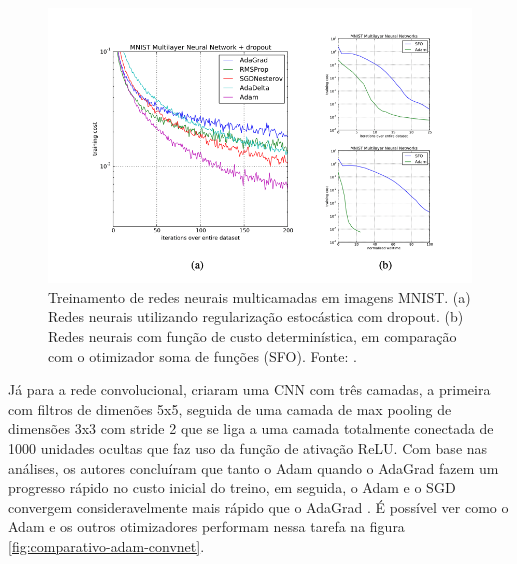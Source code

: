 \begin{figure}[h]
    \centering
    \includegraphics[width=0.85\linewidth]{../imagens/retropropagacao-gradiente/comparativo-adam-multilayer.png}
    
    \caption[Treinamento de redes neurais multicamadas no MNIST]{%
        Treinamento de redes neurais multicamadas em imagens MNIST. (a) Redes neurais utilizando regularização estocástica com dropout. (b) Redes neurais com função de custo determinística, em comparação com o otimizador soma de funções (SFO).
        \newline
        \small Fonte: \parencite{AdamMethod}.
    }
    \label{fig:comparativo-adam-multilayer}
\end{figure}

Já para a rede convolucional, \textcite{AdamMethod} criaram uma CNN com três camadas, a primeira com filtros de dimenões 5x5, seguida de uma camada de max pooling de dimensões 3x3 com stride 2 que se liga a uma camada totalmente conectada de 1000 unidades ocultas que faz uso da função de ativação ReLU. Com base nas análises, os autores concluíram que tanto o Adam quando o AdaGrad fazem um progresso rápido no custo inicial do treino, em seguida, o Adam e o SGD convergem consideravelmente mais rápido que o AdaGrad \parencite{AdamMethod}. É possível ver como o Adam e os outros otimizadores performam nessa tarefa na figura \ref{fig:comparativo-adam-convnet}.


